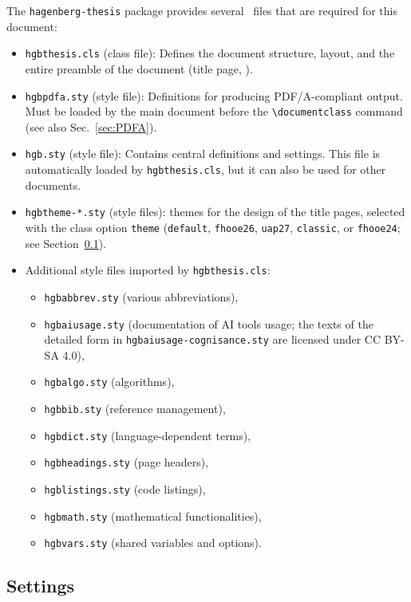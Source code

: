 The \texttt{hagenberg-thesis} package provides several \latex\ files that are
required for this document:
%
\begin{itemize}
  \item \nolinkurl{hgbthesis.cls} (class file): Defines the document
    structure, layout, and the entire preamble of the document (title page,
    \etc).
  \item \nolinkurl{hgbpdfa.sty} (style file): Definitions for producing
    PDF/A-compliant output. Must be loaded by the main document before
    the \verb!\documentclass! command (see also Sec.\ \ref{sec:PDFA}).
  \item \nolinkurl{hgb.sty} (style file): Contains central definitions and
    settings. This file is automatically loaded by \nolinkurl{hgbthesis.cls},
    but it can also be used for other documents.
  \item \nolinkurl{hgbtheme-*.sty} (style files): themes for the design of the
    title pages, selected with the class option \texttt{theme} (\texttt{default},
    \texttt{fhooe26}, \texttt{uap27}, \texttt{classic}, or \texttt{fhooe24}; see
    Section~\ref{sec:hagenberg-settings}).
  \item Additional style files imported by \nolinkurl{hgbthesis.cls}:
    \begin{itemize}
        \item[] \nolinkurl{hgbabbrev.sty} (various abbreviations),
        \item[] \nolinkurl{hgbaiusage.sty} (documentation of AI tools usage; the
          texts of the detailed form in \nolinkurl{hgbaiusage-cognisance.sty} are
          licensed under CC BY-SA 4.0),
        \item[] \nolinkurl{hgbalgo.sty} (algorithms),
        \item[] \nolinkurl{hgbbib.sty} (reference management),
        \item[] \nolinkurl{hgbdict.sty} (language-dependent terms),
        \item[] \nolinkurl{hgbheadings.sty} (page headers),
        \item[] \nolinkurl{hgblistings.sty} (code listings),
        \item[] \nolinkurl{hgbmath.sty} (mathematical functionalities),
        \item[] \nolinkurl{hgbvars.sty} (shared variables and options).
    \end{itemize}
\end{itemize}


\subsection{Settings}
\label{sec:hagenberg-settings}

